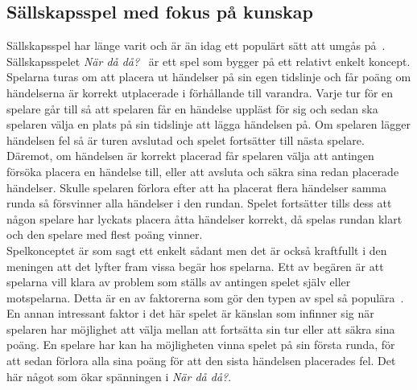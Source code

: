\documentclass[a4paper, 11pt]{article}
\begin{document}
\subsection{Sällskapsspel med fokus på kunskap} \label{nardada}
Sällskapsspel har länge varit och är än idag ett populärt sätt att umgås på~\cite{bradspelspop}. Sällskapsspelet \textit{När då då?}~\cite{nardada} är ett spel som bygger på ett relativt enkelt koncept. Spelarna turas om att placera ut händelser på sin egen tidslinje och får poäng om händelserna är korrekt utplacerade i förhållande till varandra. Varje tur för en spelare går till så att spelaren får en händelse uppläst för sig och sedan ska spelaren välja en plats på sin tidslinje att lägga händelsen på. Om spelaren lägger händelsen fel så är turen avslutad och spelet fortsätter till nästa spelare. Däremot, om händelsen är korrekt placerad får spelaren välja att antingen försöka placera en händelse till, eller att avsluta och säkra sina redan placerade händelser. Skulle spelaren förlora efter att ha placerat flera händelser samma runda så försvinner alla händelser i den rundan. Spelet fortsätter tills dess att någon spelare har lyckats placera åtta händelser korrekt, då spelas rundan klart och den spelare med flest poäng vinner.\\
Spelkonceptet är som sagt ett enkelt sådant men det är också kraftfullt i den meningen att det lyfter fram vissa begär hos spelarna. Ett av begären är att spelarna vill klara av problem som ställs av antingen spelet själv eller motspelarna. Detta är en av faktorerna som gör den typen av spel så populära~\cite[sid 3--4]{psykologi}. En annan intressant faktor i det här spelet är känslan som infinner sig när spelaren har möjlighet att välja mellan att fortsätta sin tur eller att säkra sina poäng. En spelare har kan ha möjligheten vinna spelet på sin första runda, för att sedan förlora alla sina poäng för att den sista händelsen placerades fel. Det här något som ökar spänningen i \textit{När då då?}.
\end{document}
